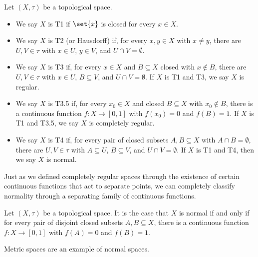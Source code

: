 \begin{definition}\label{def:separation_axioms}
Let $\left(X,\tau\right)$ be a topological space.
\begin{itemize}
  \item We say $X$ is T1 if $\set{x}$ is closed for every $x\in X$.
  \item We say $X$ is T2 (or Hausdorff) if, for every $x,y\in X$ with $x\neq y$, there are $U,V\in \tau$ with $x\in U$, $y\in V$, and $U\cap V = \emptyset$.
  \item We say $X$ is T3 if, for every $x\in X$ and $B\subseteq X$ closed with $x\notin B$, there are $U,V\in \tau$ with $x\in U$, $B\subseteq V$, and $U\cap V = \emptyset$. If $X$ is T1 and T3, we say $X$ is regular.
  \item We say $X$ is T3.5 if, for every $x_0\in X$ and closed $B\subseteq X$ with $x_0\notin B$, there is a continuous function $f\colon X\rightarrow [0,1]$ with $f\left(x_0\right) = 0$ and $f\left(B\right) = 1$. If $X$ is T1 and T3.5, we say $X$ is completely regular.
  \item We say $X$ is T4 if, for every pair of closed subsets $A,B\subseteq X$ with $A\cap B = \emptyset$, there are $U,V\in \tau$ with $A\subseteq U$, $B\subseteq V$, and $U\cap V = \emptyset$. If $X$ is T1 and T4, then we say $X$ is normal.
\end{itemize}
\end{definition}
Just as we defined completely regular spaces through the existence of certain continuous functions that act to separate points, we can completely classify normality through a separating family of continuous functions.
\begin{theorem}
  Let $\left(X,\tau\right)$ be a topological space. It is the case that $X$ is normal if and only if for every pair of disjoint closed subsets $A,B\subseteq X$, there is a continuous function $f\colon X\rightarrow [0,1]$ with $f\left(A\right) = 0$ and $f\left(B\right) = 1$.
\end{theorem}
\begin{remark}
  Metric spaces are an example of normal spaces.
\end{remark}
